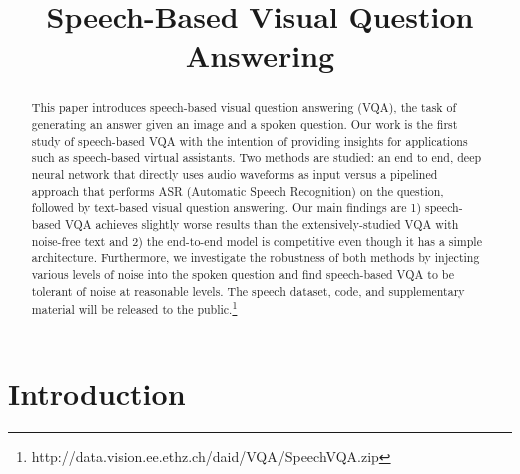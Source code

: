\documentclass[letterpaper]{article} %
\begin{document}
\title{Speech-Based Visual Question Answering}





\maketitle
\begin{abstract}
This paper introduces speech-based visual question answering (VQA), the task of generating an answer given an image and a spoken question. Our work is the first study of speech-based VQA with the intention of providing insights for applications such as speech-based virtual assistants. Two methods are studied: an end to end, deep neural network that directly uses audio waveforms as input versus a pipelined approach that performs ASR (Automatic Speech Recognition) on the question, followed by text-based visual question answering. Our main findings are 1) speech-based VQA achieves slightly worse results than the extensively-studied VQA with noise-free text and 2) the end-to-end model is competitive even though it has a simple architecture. Furthermore, we investigate the robustness of both methods by injecting various levels of noise into the spoken question and find speech-based VQA to be tolerant of noise at reasonable levels. The speech dataset, code, and supplementary material will be released to the public.\footnote{http://data.vision.ee.ethz.ch/daid/VQA/SpeechVQA.zip}

\end{abstract}
\label{sec:intro}
\section{Introduction}
\end{document}
